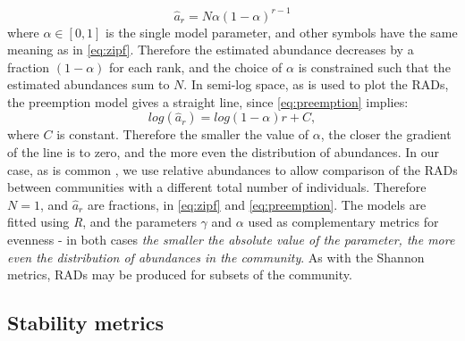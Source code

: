 \begin{equation}
\hat{a}_r = N\alpha(1-\alpha)^{r-1}
\label{eq:preemption}
\end{equation}
%  
where $\alpha \in [0,1]$ is the single model parameter, and other symbols have the same meaning as in \eqref{eq:zipf}. Therefore the estimated abundance decreases by a fraction $(1-\alpha)$ for each rank, and the choice of $\alpha$ is constrained such that the estimated abundances sum to $N$. In semi-log space, as is used to plot the RADs, the preemption model gives a straight line, since \eqref{eq:preemption} implies:
\begin{equation}
log\left(\hat{a}_r\right) = log\left(1-\alpha\right)r + C,
\label{eq:preemption_line}
\end{equation}
%  
where $C$ is constant. Therefore the smaller the value of $\alpha$, the closer the gradient of the line is to zero, and the more even the distribution of abundances. In our case, as is common \cite{oksanen2007vegan}, we use relative abundances to allow comparison of the RADs between communities with a different total number of individuals. Therefore $N=1$, and $\hat{a}_r$ are fractions, in \eqref{eq:zipf} and \eqref{eq:preemption}. The models are fitted using \emph{R}, and the parameters $\gamma$ and $\alpha$ used as complementary metrics for evenness - in both cases \emph{the smaller the absolute value of the parameter, the more even the distribution of abundances in the community}. As with the Shannon metrics, RADs may be produced for subsets of the community.   


\subsection{Stability metrics}
\label{sec:def_stability_metrics}

